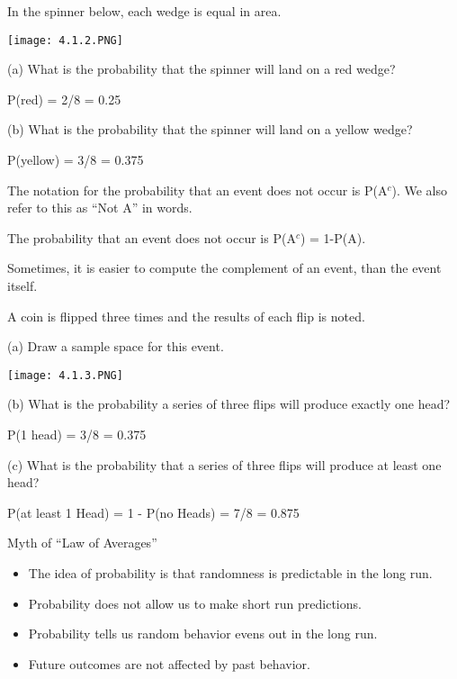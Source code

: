 \documentclass[../stats.tex]{subfiles}
\begin{document}
\begin{example}
    In the spinner below, each wedge is equal in area.
    \begin{center}
        \texttt{[image: 4.1.2.PNG]}
    \end{center}

    (a) What is the probability that the spinner will land on a red wedge?

    P(red) = 2/8 = 0.25 

    (b) What is the probability that the spinner will land on a yellow wedge?

    P(yellow) = 3/8 = 0.375
\end{example}

The notation for the probability that an event does not occur is P(A$^c$). We also refer to this as ``Not A'' in words.

The probability that an event does not occur is P(A$^c$) = 1-P(A).

Sometimes, it is easier to compute the complement of an event, than the event itself.

\begin{example}
    A coin is flipped three times and the results of each flip is noted.

    (a) Draw a sample space for this event.
    \begin{center}
        \texttt{[image: 4.1.3.PNG]}
    \end{center}

    (b) What is the probability a series of three flips will produce exactly one head?

    P(1 head) = 3/8 = 0.375

    (c) What is the probability that a series of three flips will produce at least one head?

    P(at least 1 Head) = 1 - P(no Heads) = 7/8 = 0.875
\end{example}

Myth of ``Law of Averages''
\begin{itemize}
    \item The idea of probability is that randomness is predictable in the long run.
    \item Probability does not allow us to make short run predictions.
    \item Probability tells us random behavior evens out in the long run.
    \item Future outcomes are not affected by past behavior.
\end{itemize}
\end{document}
